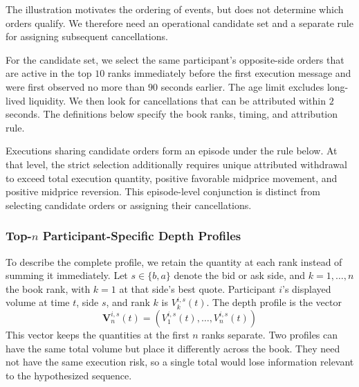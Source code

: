 \documentclass[11pt]{article}
\begin{document}
The illustration motivates the ordering of events, but does not determine which orders qualify. We therefore need an operational candidate set and a separate rule for assigning subsequent cancellations.

For the candidate set, we select the same participant's opposite-side orders that are active in the top $10$ ranks immediately before the first execution message and were first observed no more than $90$ seconds earlier. The age limit excludes long-lived liquidity. We then look for cancellations that can be attributed within $2$ seconds. The definitions below specify the book ranks, timing, and attribution rule.

Executions sharing candidate orders form an episode under the rule below. At that level, the strict selection additionally requires unique attributed withdrawal to exceed total execution quantity, positive favorable midprice movement, and positive midprice reversion. This episode-level conjunction is distinct from selecting candidate orders or assigning their cancellations.

\subsubsection{\texorpdfstring{Top-$n$}{Top-n} Participant-Specific Depth Profiles}
\label{subsec:topn_depth_profiles}

To describe the complete profile, we retain the quantity at each rank instead of summing it immediately. Let $s\in\{b,a\}$ denote the bid or ask side, and $k=1,\ldots,n$ the book rank, with $k=1$ at that side's best quote. Participant $i$'s displayed volume at time $t$, side $s$, and rank $k$ is $V^{i,s}_{k}(t)$. The depth profile is the vector
\begin{equation}
    \mathbf{V}^{i,s}_{n}(t)
    = \left(V^{i,s}_{1}(t),\ldots,V^{i,s}_{n}(t)\right)
\end{equation}
This vector keeps the quantities at the first $n$ ranks separate. Two profiles can have the same total volume but place it differently
across the book. They need not have the same execution risk, so a single total would lose information relevant to the
hypothesized sequence.
\end{document}
